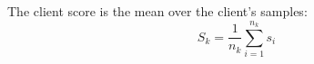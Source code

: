 \documentclass[runningheads]{llncs}
\begin{document}
The client score is the mean over the client's samples:
\begin{equation}
S_k = \frac{1}{n_k} \sum_{i=1}^{n_k} s_i
\label{eq:score}
\end{equation}






\end{document}
